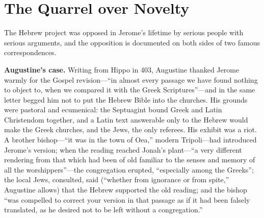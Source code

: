 \section{The Quarrel over Novelty}

The Hebrew project was opposed in Jerome's lifetime by serious people with
serious arguments, and the opposition is documented on both sides of two
famous correspondences.

\textbf{Augustine's case.} Writing from Hippo in 403, Augustine thanked
Jerome warmly for the Gospel revision---``in almost every passage we have
found nothing to object to, when we compared it with the Greek
Scriptures''---and in the same letter begged him not to put the Hebrew
Bible into the churches. His grounds were pastoral and ecumenical: the
Septuagint bound Greek and Latin Christendom together, and a Latin text
answerable only to the Hebrew would make the Greek churches, and the
Jews, the only referees. His exhibit was a riot. A brother bishop---``it
was in the town of Oea,'' modern Tripoli---had introduced Jerome's
version; when the reading reached Jonah's plant---``a very different
rendering from that which had been of old familiar to the senses and
memory of all the worshippers''---the congregation erupted, ``especially
among the Greeks''; the local Jews, consulted, said (``whether from
ignorance or from spite,'' Augustine allows) that the Hebrew supported the
old reading; and the bishop ``was compelled to correct your version in
that passage as if it had been falsely translated, as he desired not to be
left without a congregation.''

